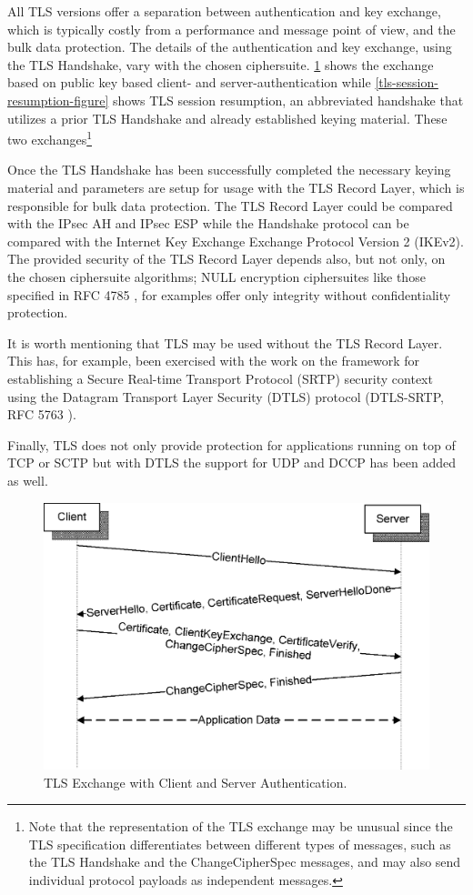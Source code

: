 \documentclass[a4paper, 10pt]{IEEEtran}
\begin{document}
All TLS versions offer a separation between authentication and key exchange, which is typically costly from a performance and message point of view, and the bulk data protection. The details of the authentication and key exchange, using the TLS Handshake, vary with the chosen ciphersuite. \ref{tls-client-authentication-figure} shows the exchange based on public key based client- and server-authentication while \ref{tls-session-resumption-figure} shows TLS session resumption, an abbreviated handshake that utilizes a prior TLS Handshake and already established keying material. These two exchanges\footnote{Note that the representation of the TLS exchange may be unusual since the TLS specification differentiates between different types of messages, such as the TLS Handshake and the ChangeCipherSpec messages, and may also send individual protocol payloads as independent messages.} 

Once the TLS Handshake has been successfully completed the necessary keying material and parameters are setup for usage with the TLS Record Layer, which is responsible for bulk data protection. The TLS Record Layer could be compared with the IPsec AH and IPsec ESP while the Handshake protocol can be compared with the Internet Key Exchange Exchange Protocol Version 2 (IKEv2). The provided security of the TLS Record Layer depends also, but not only, on the chosen ciphersuite algorithms; NULL encryption ciphersuites like those specified in RFC 4785 \cite{rfc4785}, for examples offer only integrity without confidentiality protection. 

It is worth mentioning that TLS may be used without the TLS Record Layer. This has, for example, been exercised with the work on the framework for establishing a Secure Real-time Transport Protocol (SRTP) security context using the Datagram Transport Layer Security (DTLS) protocol (DTLS-SRTP, RFC 5763 \cite{rfc5763}).

Finally, TLS does not only provide protection for applications running on top of TCP or SCTP but with DTLS \cite{rfc4347} the support for UDP and DCCP has been added as well.
 
\begin{figure}[!t]
 \centering
 \includegraphics[scale=0.50]{TLS-Client-Authentication}
 \caption{TLS Exchange with Client and Server Authentication.}
 \label{tls-client-authentication-figure}
\end{figure}
\end{document}
